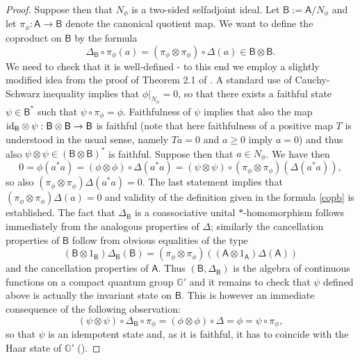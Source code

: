 \documentclass[12pt]{amsart}
\theoremstyle{definition}
\theoremstyle{remark}
\numberwithin{equation}{section}
\begin{document}
\begin{proof}
Suppose then that $N_{\phi}$ is a two-sided selfadjoint ideal. Let $\mathsf{B}:= \mathsf{A}/N_{\phi}$ and let $\pi_{\phi}:\mathsf{A} \to \mathsf{B}$ denote
the canonical quotient map. We want to define the coproduct on $\mathsf{B}$ by the formula
\begin{equation} \label{copb} \Delta_{\mathsf{B}}
\circ \pi_{\phi}(a) = (\pi_{\phi} \otimes \pi_{\phi})\circ \Delta(a) \in \mathsf{B} \otimes \mathsf{B}.
\end{equation}
We need to check that it is well-defined - to this end we employ a slightly modified idea from the proof of Theorem 2.1 of
\cite{bedos+murphy+tuset01}. A standard use of Cauchy-Schwarz inequality implies that $\phi|_{N_{\phi}}=0$, so that there exists
a faithful state $\psi \in \mathsf{B}^*$ such that $\psi \circ \pi_{\phi} = \phi$. Faithfulness of $\psi$ implies that also the
map ${\rm id}_{\mathsf{B}} \otimes \psi:\mathsf{B} \otimes \mathsf{B} \to \mathsf{B}$ is faithful (note that here faithfulness of
a positive map $T$ is understood in the usual sense, namely $Ta = 0$ and $a\geq 0$ imply $a=0$) and thus also $\psi \otimes
\psi\in (\mathsf{B} \otimes \mathsf{B})^*$ is faithful. Suppose then that $a \in N_{\phi}$. We have then
\[
0 = \phi(a^*a) =
(\phi \otimes \phi)\circ\Delta(a^*a) = (\psi \otimes \psi)\circ (\pi_{\phi} \otimes \pi_{\phi})(\Delta(a^*a)),
\]
so also $(\pi_{\phi} \otimes \pi_{\phi})
\Delta(a^*a) = 0$. The last statement implies that $(\pi_{\phi} \otimes \pi_{\phi}) \Delta(a) = 0$ and validity of the definition given
in the formula \eqref{copb} is established. The fact that $\Delta_{\mathsf{B}}$ is a coassociative unital $*$-homomorphism follows
immediately from the analogous properties of $\Delta$; similarly the cancellation properties of $\mathsf{B}$ follow from obvious
equalities of the type
\[
(\mathsf{B} \otimes 1_{\mathsf{B}})\Delta_{\mathsf{B}}(\mathsf{B})  =
(\pi_{\phi} \otimes \pi_{\phi}) ((\mathsf{A} \otimes
1_{\mathsf{A}})\Delta(\mathsf{A}))
\]
and the cancellation properties of $\mathsf{A}$. Thus $(\mathsf{B}, \Delta_{\mathsf{B}})$ is the algebra of continuous functions on a compact quantum group ${\mathbb{G}}'$ and it remains to check that
$\psi$ defined above is actually the invariant state on $\mathsf{B}$. This is however an immediate consequence of the following
observation:
\[
(\psi \otimes \psi)\circ\Delta_{\mathsf{B}}\circ\pi_{\phi} =(\phi \otimes \phi
) \circ \Delta = \phi = \psi\circ \pi_{\phi},
\]
so that $\psi$ is an idempotent state and, as it is faithful, it has to coincide with the Haar state of ${\mathbb{G}}'$ (\cite{woronowicz98}).
\end{proof}
\end{document}
